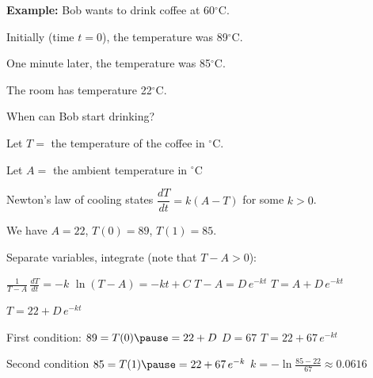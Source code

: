 \documentclass[10pt,aspectratio=169]{beamer}
\begin{document}
\begin{frame}

\textbf{Example:}
Bob wants to drink coffee at 60${}^\circ$C.

\pause
Initially (time $t=0$), the temperature was 89${}^\circ$C.

\pause
One minute later, the temperature was 85${}^\circ$C.

\pause
The room has temperature 22${}^\circ$C.

\pause
When can Bob start drinking?

\medskip
\pause

Let $T =$ the temperature of the coffee in ${}^\circ$C.

\pause
Let $A =$ the ambient temperature in ${}^\circ$C

\medskip
\pause

Newton's law of cooling states \qquad
$\dfrac{dT}{dt} = k(A-T)$ \quad for some $k > 0$.

\medskip
\pause

We have $A=22$, $T(0)=89$, $T(1)=85$.

\medskip
\pause

Separate variables, integrate (note that $T-A > 0$):

\medskip
\pause

\quad
$\displaystyle
\frac{1}{T-A} \, \frac{dT}{dt} = -k$
\pause
\wthus
$\displaystyle
\ln (T-A) = -kt + C$
\pause
\wthus
$\displaystyle
T-A = D\, e^{-kt}$
\pause
\wthus
$\displaystyle
T = A + D\, e^{-kt}$

\medskip
\pause

\wthus
$T = 22 + D\, e^{-kt}$

\medskip
\pause

First condition:
\quad
$89 = T(0) \pause = 22 + D$
\pause
\wthus 
$D = 67$
\pause
\wthus $T = 22 + 67\, e^{-kt}$

\medskip
\pause

Second condition
\quad
$85 = T(1) \pause
= 22 + 67\, e^{-k}$
\pause
\wthus
$k = - \ln \frac{85-22}{67} \approx 0.0616$

\end{frame}
\end{document}
